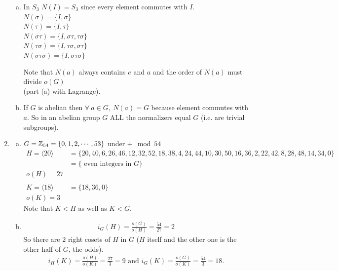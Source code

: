 \begin{enumerate}
\begin{enumerate}[a)]
    \item In $S_3$ $N(I)=S_3$ since every element commutes with $I$. \\
    $N(\sigma) = \{I, \sigma \}$ \\
    $N(\tau) = \{I, \tau \}$ \\
    $N(\sigma \tau) = \{I, \sigma\tau, \tau\sigma \}$ \\
    $N( \tau \sigma) = \{I, \tau\sigma, \sigma\tau \}$ \\
    $N(\sigma \tau \sigma) = \{I, \sigma \tau \sigma \}$
    \begin{tcolorbox}
        Note that $N(a)$ always contains $e$ and $a$ and the order of $N(a)$ must divide $o(G)$ \\ (part (a) with Lagrange). 
    \end{tcolorbox}
    \item If $G$ is abelian then $\forall \ a \in G, \ N(a)=G $ because  element commutes with $a$. So in an abelian group $G$ ALL the normalizers equal $G$ (i.e. are trivial subgroups).
\end{enumerate}

\item 
\begin{enumerate}[a)]
    \item $G = {\mathbb{ Z}}_{54} = \{0,1,2, \cdots, 53 \}$ under $+ \mod 54$
    \begin{align*}
        H =\langle 20 \rangle &= \{20, 40, 6, 26, 46, 12, 32, 52, 18, 38, 4, 24, 44, 10, 30, 50, 16, 36, 2, 22, 42, 8, 28, 48, 14, 34, 0\}  \\ 
        &= \{ \text{ even integers in }G \} \\
        o(H) = 27 \\
        \\
        K = \langle 18 \rangle &= \{18, 36, 0 \} \\
        o(K)= 3 
    \end{align*}
    Note that $K<H$ as well as $K<G$.

    \item 
    \begin{align*}
        i_G(H)= \frac{o(G)}{o(H)}= \frac{54}{27} = 2    
    \end{align*}
    So there are $2$ right cosets of $H$ in $G$ ($H$ itself and the other one is the other half of $G$, the odds).
    \begin{align*}
        i_H(K)= \frac{o(H)}{o(K)} = \frac{27}{3} = 9 \text{ and } i_G(K) = \frac{o(G)}{o(K)}= \frac{54}{3} = 18.
    \end{align*}


\end{enumerate}
\end{enumerate}
